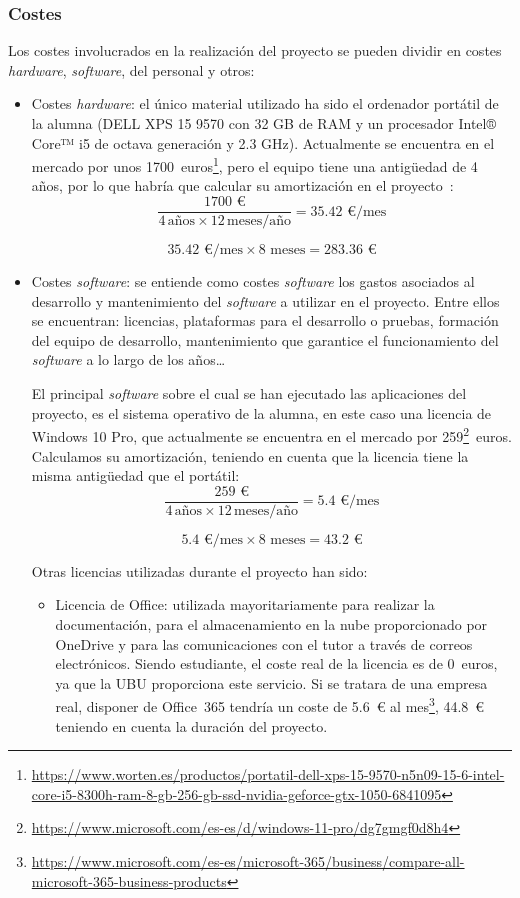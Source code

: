 \subsubsection{Costes}
Los costes involucrados en la realización del proyecto se pueden dividir en costes \textit{hardware}, \textit{software}, del personal y otros:
\begin{itemize}
\item Costes \textit{hardware}: el único material utilizado ha sido el ordenador portátil de la alumna (DELL XPS 15 9570 con 32 GB de RAM y un procesador Intel® Core™ i5 de octava generación y 2.3 GHz). Actualmente se encuentra en el mercado por unos 1700~euros\footnote{\url{https://www.worten.es/productos/portatil-dell-xps-15-9570-n5n09-15-6-intel-core-i5-8300h-ram-8-gb-256-gb-ssd-nvidia-geforce-gtx-1050-6841095}}, pero el equipo tiene una antigüedad de 4 años, por lo que habría que calcular su amortización en el proyecto~\cite{amortizacionEquipos}:
$$\frac{\text{1700 €}}{4 \, \text{años} \times 12 \, \text{meses/año}} = \text{35.42 €/mes}$$

$$\text{35.42 €/mes} \times \text{8 meses} = \text{283.36 €}$$


\item Costes \textit{software}: se entiende como costes \textit{software} los gastos asociados al desarrollo y mantenimiento del \textit{software} a utilizar en el proyecto. Entre ellos se encuentran: licencias, plataformas para el desarrollo o pruebas, formación del equipo de desarrollo, mantenimiento que garantice el funcionamiento del \textit{software} a lo largo de los años\ldots

El principal \textit{software} sobre el cual se han ejecutado las aplicaciones del proyecto, es el sistema operativo de la alumna, en este caso una licencia de Windows 10 Pro, que actualmente se encuentra en el mercado por 259\footnote{\url{https://www.microsoft.com/es-es/d/windows-11-pro/dg7gmgf0d8h4}}~euros. Calculamos su amortización, teniendo en cuenta que la licencia tiene la misma antigüedad que el portátil:
$$\frac{\text{259 €}}{4 \, \text{años} \times 12 \, \text{meses/año}} = \text{5.4 €/mes}$$

$$\text{5.4 €/mes} \times \text{8 meses} = \text{43.2 €}$$



Otras licencias utilizadas durante el proyecto han sido:
\begin{itemize}
    \item Licencia de Office: utilizada mayoritariamente para realizar la documentación, para el almacenamiento en la nube proporcionado por OneDrive y para las comunicaciones con el tutor a través de correos electrónicos. Siendo estudiante, el coste real de la licencia es de 0~euros, ya que la UBU proporciona este servicio. Si se tratara de una empresa real, disponer de Office~365 tendría un coste de 5.6~€ al mes\footnote{\url{https://www.microsoft.com/es-es/microsoft-365/business/compare-all-microsoft-365-business-products}}, 44.8~€ teniendo en cuenta la duración del proyecto.
    

\end{itemize}
\end{itemize}
